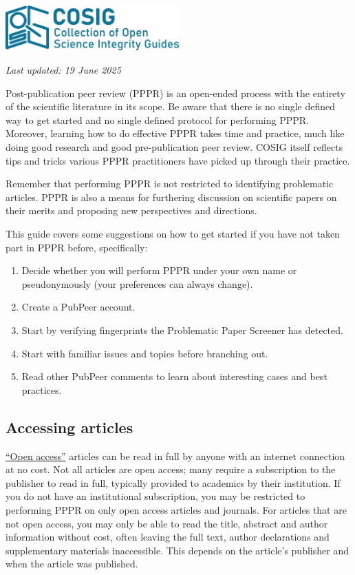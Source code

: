\documentclass[letterpaper, 12pt]{article}
\begin{document}
\flushleft\includegraphics[width=0.5\textwidth]{img/home/241017_final_logo_mockup.png}

\textit{Last updated: 19 June 2025}

Post-publication peer review (PPPR) is an open-ended process with the entirety of the scientific literature in its scope. Be aware that there is no single defined way to get started and no single defined protocol for performing PPPR. Moreover, learning how to do effective PPPR takes time and practice, much like doing good research and good pre-publication peer review. COSIG itself reflects tips and tricks various PPPR practitioners have picked up through their practice.

Remember that performing PPPR is not restricted to identifying problematic articles. PPPR is also a means for furthering discussion on scientific papers on their merits and proposing new perspectives and directions.

This guide covers some suggestions on how to get started if you have not taken part in PPPR before, specifically:

\begin{enumerate}
    \setlength\itemsep{-0.5em}
    \item Decide whether you will perform PPPR under your own name or pseudonymously (your preferences can always change).
    \item Create a PubPeer account.
    \item Start by verifying fingerprints the Problematic Paper Screener has detected.
    \item Start with familiar issues and topics before branching out.
    \item Read other PubPeer comments to learn about interesting cases and best practices.
\end{enumerate}

\subsection*{Accessing articles}

\href{https://en.wikipedia.org/wiki/Open_access}{``Open access''} articles can be read in full by anyone with an internet connection at no cost. Not all articles are open access; many require a subscription to the publisher to read in full, typically provided to academics by their institution. If you do not have an institutional subscription, you may be restricted to performing PPPR on only open access articles and journals. For articles that are not open access, you may only be able to read the title, abstract and author information without cost, often leaving the full text, author declarations and supplementary materials inaccessible. This depends on the article's publisher and when the article was published.
 
\end{document}
